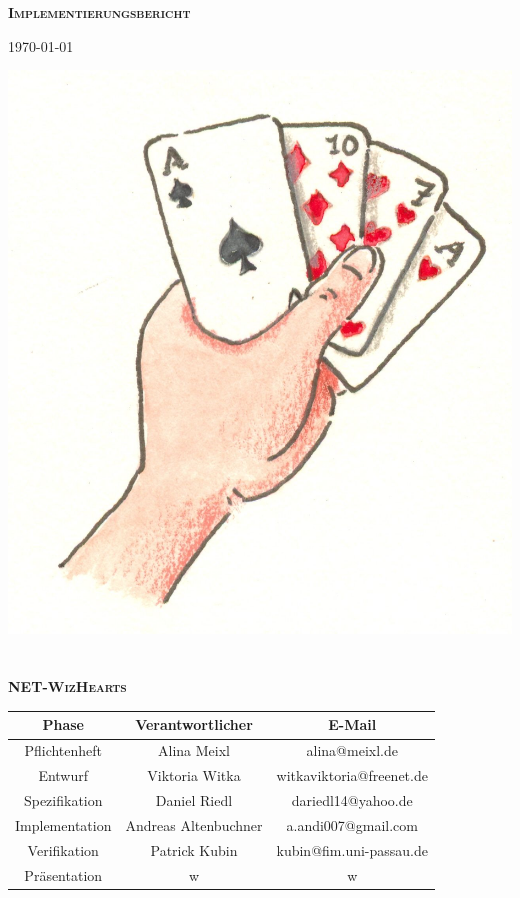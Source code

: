 \documentclass{article}
\begin{document}
\begin{titlepage}

\begin{center}
\textbf{\textsc{\LARGE Implementierungsbericht}}

{\large \today}

\vspace{2cm}
\includegraphics{kartenspiel}
\ \\
\ \\

\textbf{\textsc{\LARGE NET-WizHearts}}
\vspace{2cm}

\begin{tabular}{|c|c|c|}\hline
   Phase & Verantwortlicher & E-Mail \\ \hline\hline
   Pflichtenheft & Alina Meixl &  alina@meixl.de \\ \hline
   Entwurf & Viktoria Witka & witkaviktoria@freenet.de \\ \hline
   Spezifikation & Daniel Riedl & dariedl14@yahoo.de \\ \hline
   Implementation & Andreas Altenbuchner& a.andi007@gmail.com\\ \hline
   Verifikation & Patrick Kubin & kubin@fim.uni-passau.de\\ \hline
   Präsentation & w& w\\ \hline
 \end{tabular}

\end{center}

\end{titlepage}
\end{document}
